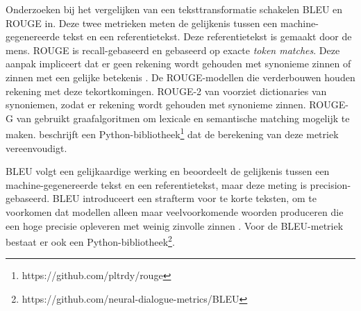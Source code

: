 Onderzoeken bij het vergelijken van een teksttransformatie schakelen BLEU en ROUGE in. Deze twee metrieken meten de gelijkenis tussen een machine-gegenereerde tekst en een referentietekst. Deze referentietekst is gemaakt door de mens. ROUGE is recall-gebaseerd en gebaseerd op exacte \textit{token matches}. Deze aanpak impliceert dat er geen rekening wordt gehouden met synonieme zinnen of zinnen met een gelijke betekenis \autocite{Lin2004}. De ROUGE-modellen die verderbouwen houden rekening met deze tekortkomingen. ROUGE-2 van \textcite{Ganesan2018} voorziet dictionaries van synoniemen, zodat er rekening wordt gehouden met synonieme zinnen. ROUGE-G van \textcite{ShafieiBavani2018} gebruikt graafalgoritmen om lexicale en semantische matching mogelijk te maken. \textcite{Lin2004} beschrijft een Python-bibliotheek\footnote{https://github.com/pltrdy/rouge} dat de berekening van deze metriek vereenvoudigt.

BLEU volgt een gelijkaardige werking en beoordeelt de gelijkenis tussen een machine-gegenereerde tekst en een referentietekst, maar deze meting is precision-gebaseerd. BLEU introduceert een strafterm voor te korte teksten, om te voorkomen dat modellen alleen maar veelvoorkomende woorden produceren die een hoge precisie opleveren met weinig zinvolle zinnen \autocite{Chiusano2022}. Voor de BLEU-metriek bestaat er ook een Python-bibliotheek\footnote{https://github.com/neural-dialogue-metrics/BLEU}. 

